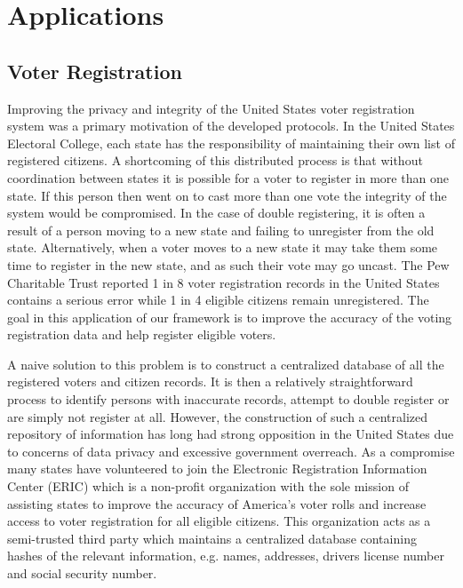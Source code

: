 \section{Applications}\label{sec:app}
\subsection{Voter Registration}\label{sec:voter}

Improving the privacy and integrity of the United States voter registration system was a primary motivation of the developed protocols. In  the United States Electoral College, each state has the responsibility of maintaining their own list of registered citizens. A shortcoming of this distributed process is that without coordination between states it is possible for a voter to register in more than one state. If this person then went on to cast more than one vote the integrity of the system would be compromised. In the case of double registering, it is often a result of a person moving to a new state and failing to unregister from the old state. Alternatively, when a voter moves to a new state it may take them some time to register in the new state, and as such their vote may go uncast. The Pew Charitable Trust\cite{pew} reported 1 in 8 voter registration records in the United States contains a serious error while 1 in 4 eligible citizens remain unregistered. The goal in this application of our framework is to improve the accuracy of the voting registration data and help register eligible voters. 

A naive solution to this problem is to construct a centralized database of all the registered voters and citizen records. It is then a relatively straightforward process to identify persons with inaccurate records, attempt to double register or are simply not register at all. However, the construction of such a centralized repository of information has long had strong opposition in the United States due to concerns of data privacy and  excessive government overreach. As a compromise many states have volunteered to join the Electronic Registration Information Center (ERIC)\cite{eric} which is a non-profit organization with the sole mission of assisting states to improve the accuracy of America’s voter rolls and increase access to voter registration for all eligible citizens. This organization acts as a semi-trusted third party which maintains a centralized database containing hashes of the relevant information, e.g. names, addresses, drivers license number and social security number. 

